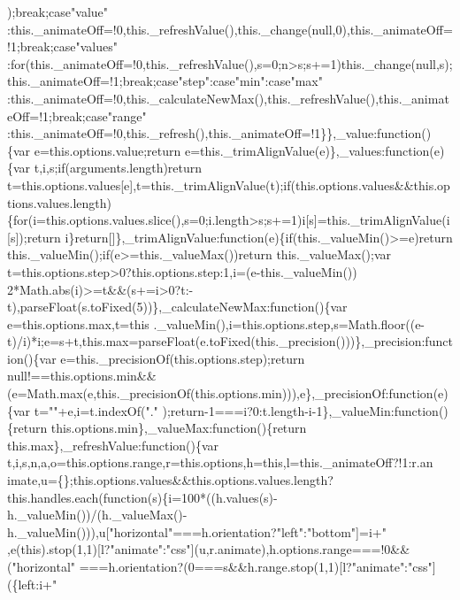 \begin{DoxyCode}
{{      );break;case"}value\textcolor{stringliteral}{"
      :this.\_animateOff=!0,this.\_refreshValue(),this.\_change(null,0),this.\_animateOff=!1;break;case"}values\textcolor{stringliteral}{"
      :for(this.\_animateOff=!0,this.\_refreshValue(),s=0;n>s;s+=1)this.\_change(null,s);this.\_animateOff=!1;break;case"}step\textcolor{stringliteral}{":case"}min\textcolor{stringliteral}{":case"}max\textcolor{stringliteral}{"
      :this.\_animateOff=!0,this.\_calculateNewMax(),this.\_refreshValue(),this.\_animateOff=!1;break;case"}range\textcolor{stringliteral}{"
      :this.\_animateOff=!0,this.\_refresh(),this.\_animateOff=!1\}\},\_value:function()\{var e=this.options.value;return e=this.\_trimAlignValue(e)\},\_values:function(e)\{var
       t,i,s;if(arguments.length)return
       t=this.options.values[e],t=this.\_trimAlignValue(t);if(this.options.values&&this.options.values.length)\{for(i=this.options.values.slice(),s=0;i.length>s;s+=1)i[s]=this.\_trimAlignValue(i[s]);return
       i\}return[]\},\_trimAlignValue:function(e)\{if(this.\_valueMin()>=e)return this.\_valueMin();if(e>=this.\_valueMax())return
       this.\_valueMax();var t=this.options.step>0?this.options.step:1,i=(e-this.\_valueMin())%
       2*Math.abs(i)>=t&&(s+=i>0?t:-t),parseFloat(s.toFixed(5))\},\_calculateNewMax:function()\{var
       e=this.options.max,t=this
      .\_valueMin(),i=this.options.step,s=Math.floor((e-t)/i)*i;e=s+t,this.max=parseFloat(e.toFixed(this.\_precision()))\},\_precision:function()\{var e=this.\_precisionOf(this.options.step);return
       null!==this.options.min&&(e=Math.max(e,this.\_precisionOf(this.options.min))),e\},\_precisionOf:function(e)\{var t="}\textcolor{stringliteral}{"+e,i=t.indexOf("}.\textcolor{stringliteral}{"
      );return-1===i?0:t.length-i-1\},\_valueMin:function()\{return this.options.min\},\_valueMax:function()\{return
       this.max\},\_refreshValue:function()\{var
       t,i,s,n,a,o=this.options.range,r=this.options,h=this,l=this.\_animateOff?!1:r.an
      imate,u=\{\};this.options.values&&this.options.values.length?this.handles.each(function(s)\{i=100*((h.values(s)-h.\_valueMin())/(h.\_valueMax()-h.\_valueMin())),u["}horizontal\textcolor{stringliteral}{"===h.orientation?"}left\textcolor{stringliteral}{":"}bottom\textcolor{stringliteral}{"]=i+"}%
      ,e(this).stop(1,1)[l?"}animate\textcolor{stringliteral}{":"}css\textcolor{stringliteral}{"](u,r.animate),h.options.range===!0&&("}horizontal\textcolor{stringliteral}{"
      ===h.orientation?(0===s&&h.range.stop(1,1)[l?"}animate\textcolor{stringliteral}{":"}css\textcolor{stringliteral}{"](\{left:i+"}%

\end{DoxyCode}
